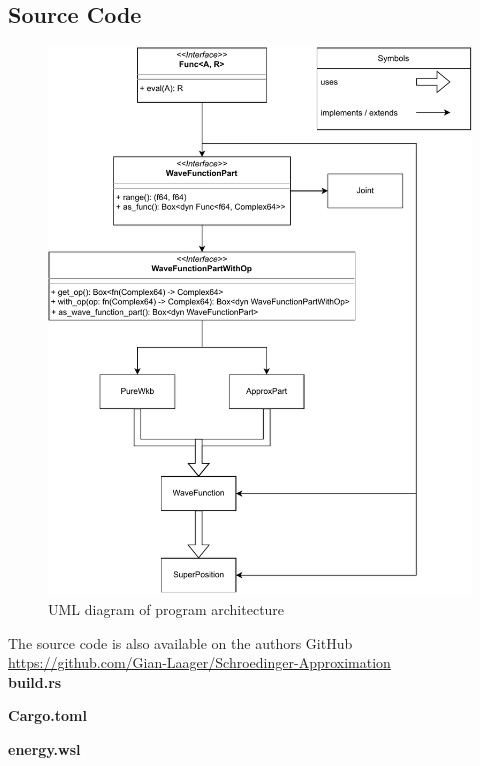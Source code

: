 \documentclass[11pt,DIV=10,final]{scrreprt} %
\begin{document}
{\begin{appendix}
\chapter{Source Code}
\begin{figure}[H]\label{fig:uml-arch}
  \centering
  \includegraphics[width=\textwidth]{program_architecture.pdf}
  \caption{UML diagram of program architecture}
\end{figure}

The source code is also available on the authors GitHub \\
\url{https://github.com/Gian-Laager/Schroedinger-Approximation}\\[3ex]
\vspace*{3ex}
{\noindent \large \bfseries build.rs}


\vspace*{3ex}
{\noindent \large \bfseries Cargo.toml}


\vspace*{3ex}
{\noindent \large \bfseries energy.wsl}



\end{appendix}}
\end{document}
